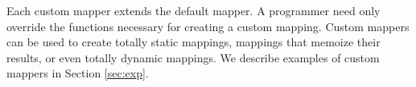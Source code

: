 Each custom mapper extends the default mapper.  A programmer need only override the functions necessary 
for creating a custom mapping.  Custom mappers can be used to create totally static mappings, 
mappings that memoize their results, or even totally dynamic mappings.  We describe examples of 
custom mappers in Section \ref{sec:exp}.





